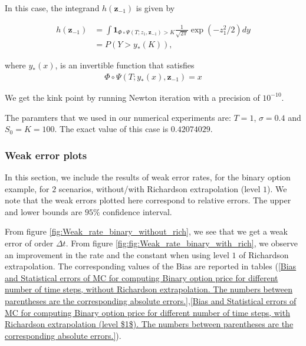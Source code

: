 \documentclass[11pt]{article}
\begin{document}
In this case, the integrand $h(\mathbf{z}_{-1})$ is given by

\begin{align}\label{smoothed_integrand_binary_opt_2}
	h(\mathbf{z}_{-1})&= \int \mathbf{1}_{\Phi \circ \Psi(T;z_1,\mathbf{z}_{-1})>K}\frac{1}{\sqrt{2 \pi}} \operatorname{exp} (-z_1^2/2) dy \nonumber\\
	&=  P(Y>y_{\ast}(K)) ,
\end{align}
 
where  $y_{\ast}(x)$, is an invertible function that satisfies 
\begin{align}
	\Phi \circ \Psi (T;y_{\ast}(x),\mathbf{z}_{-1})=x	
\end{align}

We get the kink point by running Newton iteration with a precision of $10^{-10}$.

The paramters that we used in our numerical experiments are: $T=1$, $\sigma=0.4$ and $S_0=K=100$. The exact value of this case is $0.42074029$.

\subsubsection{Weak error plots} \label{sec:Weak error plots_binary}
In this section, we include the results of weak error rates, for the binary option example, for $2$ scenarios, without/with Richardson extrapolation (level $1$). We note that the weak errors plotted here correspond to relative errors.  The upper and lower bounds are $95\%$ confidence interval.

From figure \ref{fig:Weak_rate_binary_without_rich}, we see that we get a weak error of order $\Delta t$. From figure \ref{fig:fig:Weak_rate_binary_with_rich}, we observe an improvement in the rate and the constant when using level $1$ of Richardson extrapolation. The corresponding values of the Bias are reported in tables (\ref{Bias and Statistical errors of MC  for computing Binary option price  for different number of time steps, without Richardson extrapolation. The numbers between parentheses are the corresponding absolute errors.},\ref{Bias and Statistical errors of MC  for computing Binary option price  for different number of time steps, with Richardson extrapolation (level $1$). The numbers between parentheses are the corresponding absolute errors.}).
\end{document}
